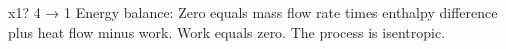 x1? 4 → 1  
Energy balance:  
Zero equals mass flow rate times enthalpy difference plus heat flow minus work.  
Work equals zero.  
The process is isentropic.